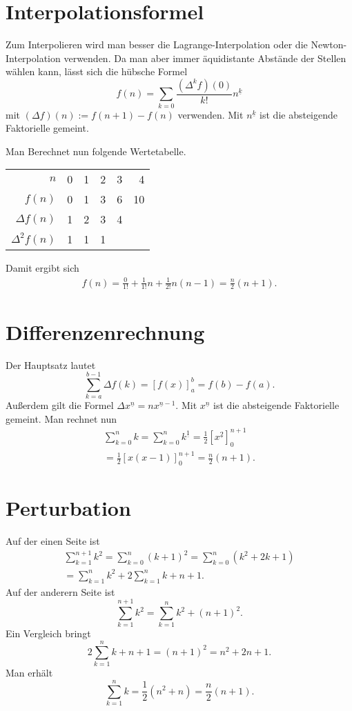 \documentclass[a4paper,10pt,fleqn,twocolumn,twoside]{article}
\begin{document}
\newpage
\section{Interpolationsformel}

Zum Interpolieren wird man besser die Lagrange-Interpolation oder
die Newton-Interpolation verwenden. Da man aber immer äquidistante
Abstände der Stellen wählen kann, lässt sich die hübsche Formel
\[f(n) = \sum_{k=0} \frac{(\Delta^k f)(0)}{k!}n^{\underline k}\]
mit $(\Delta f)(n):=f(n+1)-f(n)$ verwenden.
Mit $n^{\underline k}$ ist die absteigende Faktorielle gemeint.

Man Berechnet nun
folgende Wertetabelle.

\begin{tabular}{r|r|r|r|r|r}
$n$    & 0 & 1 & 2 & 3 & 4\\
$f(n)$ & 0 & 1 & 3 & 6 & 10\\
$\Delta f(n)$ & 1 & 2 & 3 & 4\\
$\Delta^2 f(n)$ & 1 & 1 & 1
\end{tabular}

Damit ergibt sich
\begin{gather*}
f(n) = \frac{0}{1!} + \frac{1}{1!}n + \frac{1}{2!}n(n-1)
= \frac{n}{2}(n+1).
\end{gather*}

\section{Differenzenrechnung}

Der Hauptsatz lautet
\[\sum_{k=a}^{b-1} \Delta f(k) = [f(x)]_a^b = f(b)-f(a).\]
Außerdem gilt die Formel $\Delta x^{\underline n} = nx^{\underline n-1}$.
Mit $x^{\underline n}$ ist die absteigende Faktorielle gemeint. Man rechnet nun
\begin{gather*}\sum_{k=0}^{n} k = \sum_{k=0}^{n} k^{\underline 1}
= \frac{1}{2}[x^{\underline{2}}]_0^{n+1}\\
= \frac{1}{2}[x(x-1)]_0^{n+1}
= \frac{n}{2}(n+1).
\end{gather*}

\section{Perturbation}

Auf der einen Seite ist
\begin{gather*}
\sum_{k=1}^{n+1} k^2 = \sum_{k=0}^n (k+1)^2
= \sum_{k=0}^n (k^2+2k+1)\\
= \sum_{k=1}^n k^2 + 2\sum_{k=1}^n k + n+1.
\end{gather*}
Auf der anderern Seite ist
\[\sum_{k=1}^{n+1} k^2 = \sum_{k=1}^n k^2 + (n+1)^2.\]
Ein Vergleich bringt
\[2\sum_{k=1}^n k +n+1 = (n+1)^2 = n^2+2n+1.\]
Man erhält
\[\sum_{k=1}^n k = \frac{1}{2}(n^2+n) = \frac{n}{2}(n+1).\]
\end{document}
